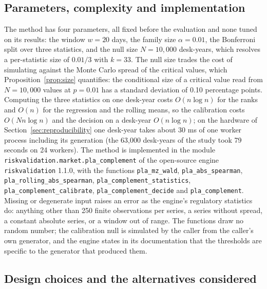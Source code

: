 \subsection{Parameters, complexity and implementation}
\label{sec:method-implementation}

The method has four parameters, all fixed before the evaluation and none tuned on its results: the window $w=20$ days, the family size $\alpha=0.01$, the Bonferroni split over three statistics, and the null size $N=10{,}000$ desk-years, which resolves a per-statistic size of $0.01/3$ with $k=33$.
The null size trades the cost of simulating against the Monte Carlo spread of the critical values, which Proposition~\ref{prop:size} quantifies: the conditional size of a critical value read from $N=10{,}000$ values at $p=0.01$ has a standard deviation of 0.10 percentage points.
Computing the three statistics on one desk-year costs $O(n\log n)$ for the ranks and $O(n)$ for the regression and the rolling means, so the calibration costs $O(Nn\log n)$ and the decision on a desk-year $O(n\log n)$; on the hardware of Section~\ref{sec:reproducibility} one desk-year takes about 30 ms of one worker process including its generation (the 63,000 desk-years of the study took 79 seconds on 24 workers).
The method is implemented in the module \texttt{riskvalidation.market.pla\_complement} of the open-source engine \texttt{riskvalidation} 1.1.0, with the functions \texttt{pla\_mz\_wald}, \texttt{pla\_abs\_spearman}, \texttt{pla\_rolling\_abs\_spearman}, \texttt{pla\_complement\_statistics}, \texttt{pla\_complement\_calibrate}, \texttt{pla\_complement\_decide} and \texttt{pla\_complement}.
Missing or degenerate input raises an error as the engine's regulatory statistics do: anything other than 250 finite observations per series, a series without spread, a constant absolute series, or a window out of range.
The functions draw no random number; the calibration null is simulated by the caller from the caller's own generator, and the engine states in its documentation that the thresholds are specific to the generator that produced them.

\subsection{Design choices and the alternatives considered}
\label{sec:method-choices}

